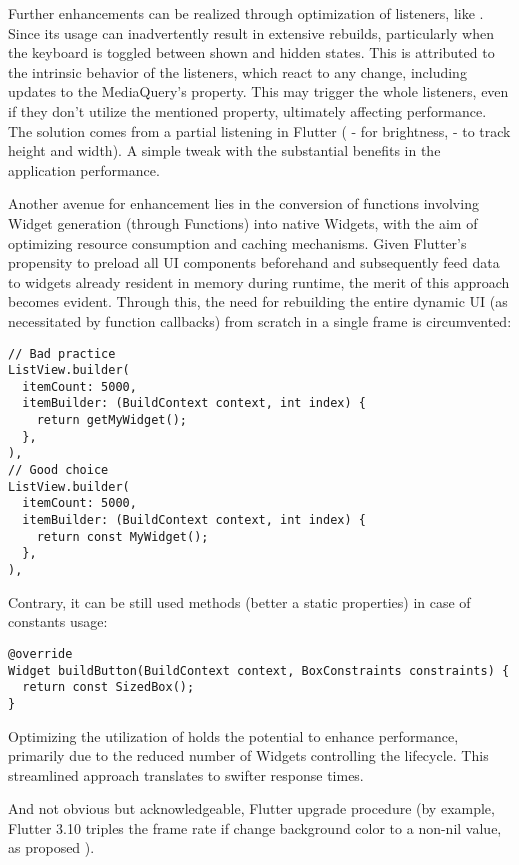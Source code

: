 Further enhancements can be realized through optimization of listeners, like . 
Since its usage can inadvertently result in extensive rebuilds, particularly when the keyboard is toggled between 
shown and hidden states. This is attributed to the intrinsic behavior of the  listeners, which react to 
any change, including updates to the MediaQuery's  property. This may trigger the whole  
listeners, even if they don't utilize the mentioned property, ultimately affecting performance. The solution comes from 
a partial listening in Flutter ( - for brightness,  - to track
height and width). A simple tweak with the substantial benefits in the application performance.

Another avenue for enhancement lies in the conversion of functions involving Widget generation (through Functions) into 
native Widgets, with the aim of optimizing resource consumption and caching mechanisms. Given Flutter's propensity to 
preload all UI components beforehand and subsequently feed data to widgets already resident in memory during runtime, 
the merit of this approach becomes evident. Through this, the need for rebuilding the entire dynamic UI (as necessitated 
by function callbacks) from scratch in a single frame is circumvented:

\begin{lstlisting}
// Bad practice
ListView.builder(
  itemCount: 5000,
  itemBuilder: (BuildContext context, int index) {
    return getMyWidget();
  },
),
// Good choice
ListView.builder(
  itemCount: 5000,
  itemBuilder: (BuildContext context, int index) {
    return const MyWidget();
  },
),
\end{lstlisting}

\noindent Contrary, it can be still used methods (better a static properties) in case of constants usage:

\begin{lstlisting}
@override
Widget buildButton(BuildContext context, BoxConstraints constraints) {
  return const SizedBox();
}
\end{lstlisting}

Optimizing the utilization of  holds the potential to enhance performance, primarily due to the 
reduced number of Widgets controlling the lifecycle. This streamlined approach translates to swifter response times.

And not obvious but acknowledgeable, Flutter upgrade procedure (by example, Flutter 3.10 triples the frame rate if 
change  background color to a non-nil value, as proposed \cite{Chis23}).


